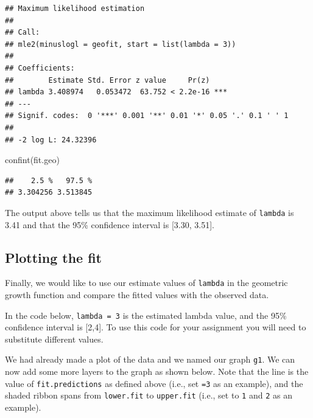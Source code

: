 \documentclass[
]{book}
\newenvironment{Shaded}{\begin{snugshade}}{\end{snugshade}}
\newcommand{\DecValTok}[1]{\textcolor[rgb]{0.00,0.00,0.81}{#1}}
\newcommand{\FunctionTok}[1]{\textcolor[rgb]{0.00,0.00,0.00}{#1}}
\newcommand{\NormalTok}[1]{#1}
\newcommand{\OtherTok}[1]{\textcolor[rgb]{0.56,0.35,0.01}{#1}}
\newcommand{\SpecialCharTok}[1]{\textcolor[rgb]{0.00,0.00,0.00}{#1}}
\begin{document}
\begin{verbatim}
## Maximum likelihood estimation
## 
## Call:
## mle2(minuslogl = geofit, start = list(lambda = 3))
## 
## Coefficients:
##        Estimate Std. Error z value     Pr(z)    
## lambda 3.408974   0.053472  63.752 < 2.2e-16 ***
## ---
## Signif. codes:  0 '***' 0.001 '**' 0.01 '*' 0.05 '.' 0.1 ' ' 1
## 
## -2 log L: 24.32396
\end{verbatim}

\begin{Shaded}
\begin{Highlighting}[]
\FunctionTok{confint}\NormalTok{(fit.geo)}
\end{Highlighting}
\end{Shaded}

\begin{verbatim}
##    2.5 %   97.5 % 
## 3.304256 3.513845
\end{verbatim}

The output above tells us that the maximum likelihood estimate of \texttt{lambda} is 3.41 and that the 95\% confidence interval is {[}3.30, 3.51{]}.

\hypertarget{plotting-the-fit}{%
\subsection{Plotting the fit}\label{plotting-the-fit}}

Finally, we would like to use our estimate values of \texttt{lambda} in the geometric growth function and compare the fitted values with the observed data.

In the code below, \texttt{lambda\ =\ 3} is the estimated lambda value, and the 95\% confidence interval is {[}2,4{]}. To use this code for your assignment you will need to substitute different values.

\begin{Shaded}
\end{Shaded}

We had already made a plot of the data and we named our graph \texttt{g1}. We can now add some more layers to the graph as shown below. Note that the line is the value of \texttt{fit.predictions} as defined above (i.e., set \texttt{=3} as an example), and the shaded ribbon spans from \texttt{lower.fit} to \texttt{upper.fit} (i.e., set to \texttt{1} and \texttt{2} as an example).
\end{document}

